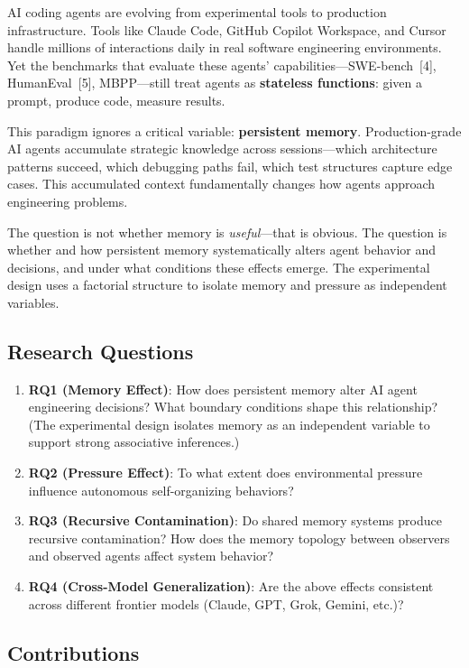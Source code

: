 \documentclass[11pt, a4paper]{article}
\begin{document}
AI coding agents are evolving from experimental tools to production infrastructure. Tools like Claude Code, GitHub Copilot Workspace, and Cursor handle millions of interactions daily in real software engineering environments. Yet the benchmarks that evaluate these agents' capabilities---SWE-bench~[4], HumanEval~[5], MBPP---still treat agents as \textbf{stateless functions}: given a prompt, produce code, measure results.

This paradigm ignores a critical variable: \textbf{persistent memory}. Production-grade AI agents accumulate strategic knowledge across sessions---which architecture patterns succeed, which debugging paths fail, which test structures capture edge cases. This accumulated context fundamentally changes how agents approach engineering problems.

The question is not whether memory is \textit{useful}---that is obvious. The question is whether and how persistent memory systematically alters agent behavior and decisions, and under what conditions these effects emerge. The experimental design uses a factorial structure to isolate memory and pressure as independent variables.

\subsection{Research Questions}

\begin{enumerate}
  \item \textbf{RQ1 (Memory Effect)}: How does persistent memory alter AI agent engineering decisions? What boundary conditions shape this relationship? (The experimental design isolates memory as an independent variable to support strong associative inferences.)
  \item \textbf{RQ2 (Pressure Effect)}: To what extent does environmental pressure influence autonomous self-organizing behaviors?
  \item \textbf{RQ3 (Recursive Contamination)}: Do shared memory systems produce recursive contamination? How does the memory topology between observers and observed agents affect system behavior?
  \item \textbf{RQ4 (Cross-Model Generalization)}: Are the above effects consistent across different frontier models (Claude, GPT, Grok, Gemini, etc.)?
\end{enumerate}

\subsection{Contributions}
\end{document}
